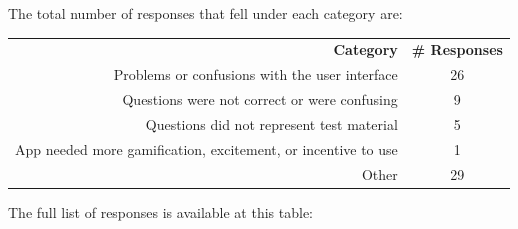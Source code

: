 \par The total number of responses that fell under each category are:

 \begin{tabular}{ r c }
	\textbf{Category} & \textbf{\# Responses} \\
	Problems or confusions with the user interface & 26 \\
	Questions were not correct or were confusing  & 9 \\
	Questions did not represent test material  & 5 \\
	App needed more gamification, excitement, or incentive to use  & 1 \\
	Other  & 29 \\
\end{tabular}

\par The full list of responses is available at this table:








 